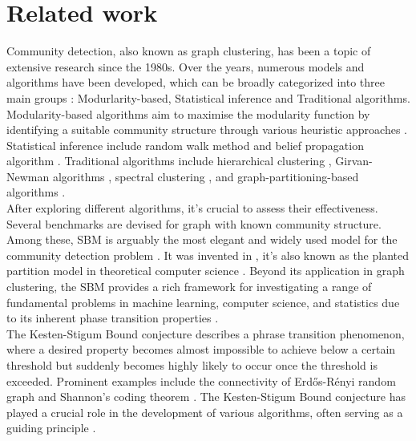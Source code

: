 \section{Related work}
Community detection, also known as graph clustering, has been a topic of extensive research since the 1980s. Over the years, numerous models and algorithms have been developed, which can be broadly categorized into three main groups \cite{review_algo}: Modurlarity-based, Statistical inference and Traditional algorithms. Modularity-based algorithms aim to maximise the modularity function by identifying a suitable community structure through various heuristic approaches  \cite{review_1_modu_Newman} \cite{review_2_modu_Newman}. Statistical inference include random walk method and belief propagation algorithm\cite{TheSurvey} \cite{TheConjecture}. Traditional algorithms include hierarchical clustering \cite{comm_dete_in_graphs}, Girvan-Newman algorithms \cite{review_Newman}, spectral clustering \cite{spec_review_1} \cite{spec_review_2}, and graph-partitioning-based algorithms \cite{partition_review}.\\
After exploring different algorithms, it's crucial to assess their effectiveness. Several benchmarks are devised for graph with known community structure. Among these, SBM is arguably the most elegant and widely used model for the community detection problem \cite{TheConjecture} \cite{userguide}. It was invented in \cite{sbm-review_1}, it's also known as the planted partition model in theoretical computer science \cite{df89}. Beyond its application in graph clustering, the SBM provides a rich framework for investigating a range of fundamental problems in machine learning, computer science, and statistics due to its inherent phase transition properties \cite{TheConjecture} \cite{Emmanuel_sbm}. \\
The Kesten-Stigum Bound conjecture describes a phrase transition phenomenon, where a desired property becomes almost impossible to achieve below a certain threshold but suddenly becomes highly likely to occur once the threshold is exceeded. Prominent examples include the connectivity of Erd\H{o}s-R\'{e}nyi random graph and Shannon's coding theorem \cite{shannon}. The Kesten-Stigum Bound conjecture has played a crucial role in the development of various algorithms, often serving as a guiding principle \cite{TheConjecture}.\\
